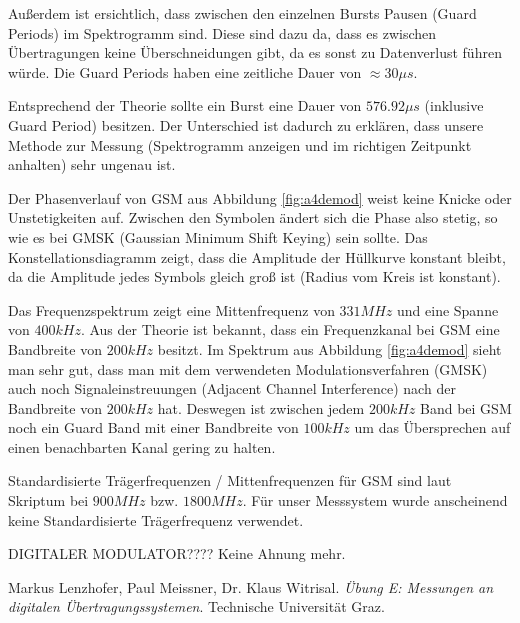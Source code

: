 \documentclass[12pt,a4paper,ngerman]{article}
\begin{document}
Außerdem ist ersichtlich, dass zwischen den einzelnen Bursts Pausen (Guard Periods) im Spektrogramm sind. Diese sind dazu da, dass es zwischen Übertragungen keine Überschneidungen gibt, da es sonst zu Datenverlust führen würde. Die Guard Periods haben eine zeitliche Dauer von $\approx 30 \mu s$.

Entsprechend der Theorie sollte ein Burst eine Dauer von $576.92 \mu s$ (inklusive Guard Period) besitzen. Der Unterschied ist dadurch zu erklären, dass unsere Methode zur Messung (Spektrogramm anzeigen und im richtigen Zeitpunkt anhalten) sehr ungenau ist.

Der Phasenverlauf von GSM aus Abbildung \ref{fig:a4demod} weist keine Knicke oder Unstetigkeiten auf. Zwischen den Symbolen ändert sich die Phase also stetig, so wie es bei GMSK (Gaussian Minimum Shift Keying) sein sollte. Das Konstellationsdiagramm zeigt, dass die Amplitude der Hüllkurve konstant bleibt, da die Amplitude jedes Symbols gleich groß ist (Radius vom Kreis ist konstant).

Das Frequenzspektrum zeigt eine Mittenfrequenz von $331 MHz$ und eine Spanne von $400 kHz$. Aus der Theorie ist bekannt, dass ein Frequenzkanal bei GSM eine Bandbreite von $200 kHz$ besitzt. Im Spektrum aus Abbildung \ref{fig:a4demod} sieht man sehr gut, dass man mit dem verwendeten Modulationsverfahren (GMSK) auch noch Signaleinstreuungen (Adjacent Channel Interference) nach der Bandbreite von $200 kHz$ hat. Deswegen ist zwischen jedem $200 kHz$ Band bei GSM noch ein Guard Band mit einer Bandbreite von $100 kHz$ um das Übersprechen auf einen benachbarten Kanal gering zu halten.

Standardisierte Trägerfrequenzen / Mittenfrequenzen für GSM sind laut Skriptum bei $900 MHz$ bzw. $1800 MHz$. Für unser Messsystem wurde anscheinend keine Standardisierte Trägerfrequenz verwendet.

DIGITALER MODULATOR???? Keine Ahnung mehr.

\begin{thebibliography}{9}

  Markus Lenzhofer, Paul Meissner, Dr. Klaus Witrisal.
  \emph{Übung E: Messungen an digitalen Übertragungssystemen}.
  Technische Universität Graz.

\end{thebibliography}


 



   
\end{document}
